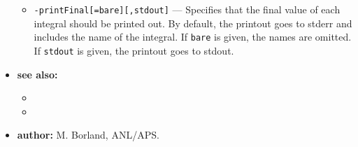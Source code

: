 \begin{itemize}
\begin{itemize}
    \item {\tt -printFinal[=bare][,stdout]} --- Specifies that the final value of each
        integral should be printed out.  By default, the printout goes to stderr and
        includes the name of the integral.  If {\tt bare} is given, the names are omitted.
        If {\tt stdout} is given, the printout goes to stdout.
    \end{itemize}
\item {\bf see also:}
    \begin{itemize}
    \item {}
    \item {}
    \end{itemize}
\item {\bf author:} M. Borland, ANL/APS.
\end{itemize}

